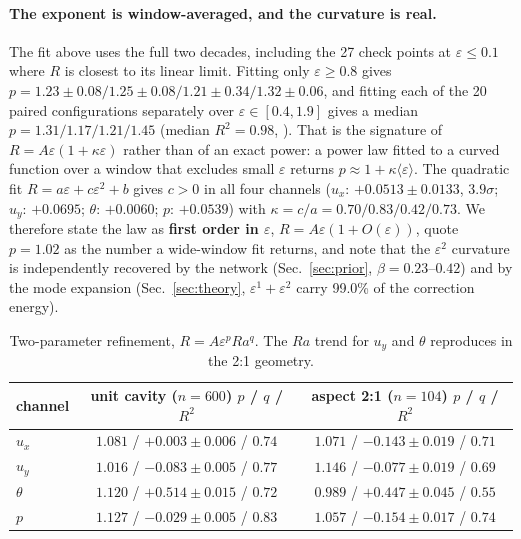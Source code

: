 \documentclass[11pt,a4paper]{article}
\begin{document}
\paragraph{The exponent is window-averaged, and the curvature is real.} The fit above uses the full
two decades, including the 27 check points at $\varepsilon\le0.1$ where $R$ is closest to its
linear limit. Fitting only $\varepsilon\ge0.8$ gives
$p=1.23\pm0.08/1.25\pm0.08/1.21\pm0.34/1.32\pm0.06$, and fitting each of the 20 paired
configurations separately over $\varepsilon\in[0.4,1.9]$ gives a median
$p=1.31/1.17/1.21/1.45$ (median $R^2=0.98$, ). That is the signature of
$R=A\varepsilon(1+\kappa\varepsilon)$ rather than of an exact power: a power law fitted to a curved
function over a window that excludes small $\varepsilon$ returns $p\approx1+\kappa\langle
\varepsilon\rangle$. The quadratic fit $R=a\varepsilon+c\varepsilon^2+b$ gives $c>0$ in all four
channels ($u_x$: $+0.0513\pm0.0133$, $3.9\sigma$; $u_y$: $+0.0695$; $\theta$: $+0.0060$; $p$:
$+0.0539$) with $\kappa=c/a=0.70/0.83/0.42/0.73$. We therefore state the law as \textbf{first order
in $\varepsilon$}, $R=A\varepsilon(1+O(\varepsilon))$, quote $p=1.02$ as the number a wide-window
fit returns, and note that the $\varepsilon^2$ curvature is independently recovered by the network
(Sec.~\ref{sec:prior}, $\beta=0.23$--$0.42$) and by the mode expansion (Sec.~\ref{sec:theory},
$\varepsilon^1+\varepsilon^2$ carry 99.0\% of the correction energy).

\begin{table}[htbp]
\centering
\small
\caption{Two-parameter refinement, $R=A\varepsilon^pRa^q$. The $Ra$ trend for $u_y$ and $\theta$
reproduces in the 2:1 geometry.}
\label{tab:two-param}
\begin{tabular}{@{}lcc@{}}
\toprule
channel & unit cavity ($n=600$) $p$ / $q$ / $R^2$ & aspect 2:1 ($n=104$) $p$ / $q$ / $R^2$\\
\midrule
$u_x$ & $1.081$ / $+0.003\pm0.006$ / $0.74$ & $1.071$ / $-0.143\pm0.019$ / $0.71$\\
$u_y$ & $1.016$ / $-0.083\pm0.005$ / $0.77$ & $1.146$ / $-0.077\pm0.019$ / $0.69$\\
$\theta$ & $1.120$ / $+0.514\pm0.015$ / $0.72$ & $0.989$ / $+0.447\pm0.045$ / $0.55$\\
$p$ & $1.127$ / $-0.029\pm0.005$ / $0.83$ & $1.057$ / $-0.154\pm0.017$ / $0.74$\\
\bottomrule
\end{tabular}
\end{table}
\end{document}
